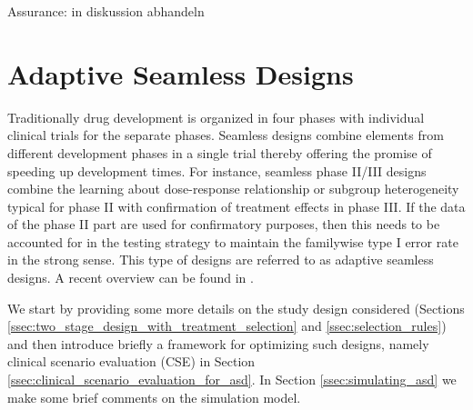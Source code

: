 \documentclass[bimj,fleqn]{w-art}
\theoremstyle{plain}
\theoremstyle{definition}
\begin{document}



Assurance: \cite{stallard_optimal_2009} in diskussion abhandeln

\section{Adaptive Seamless Designs}
\label{sec:adaptive_seamless_designs}

Traditionally drug development is organized in four phases with individual clinical trials for the separate phases. Seamless designs combine elements from different development phases in a single trial thereby offering the promise of speeding up development times. For instance, seamless phase II/III designs combine the learning about dose-response relationship or subgroup heterogeneity typical for phase II with confirmation of treatment effects in phase III. If the data of the phase II part are used for confirmatory purposes, then this needs to be accounted for in the testing strategy to maintain the familywise type I error rate in the strong sense. This type of designs are referred to as adaptive seamless designs. A recent overview can be found in \citet{friede_adaptive_2020}.

We start by providing some more details on the study design considered (Sections \ref{ssec:two_stage_design_with_treatment_selection} and \ref{ssec:selection_rules}) and then introduce briefly a framework for optimizing such designs, namely clinical scenario evaluation (CSE) in Section \ref{ssec:clinical_scenario_evaluation_for_asd}. In Section \ref{ssec:simulating_asd} we make some brief comments on the simulation model.
\end{document}
